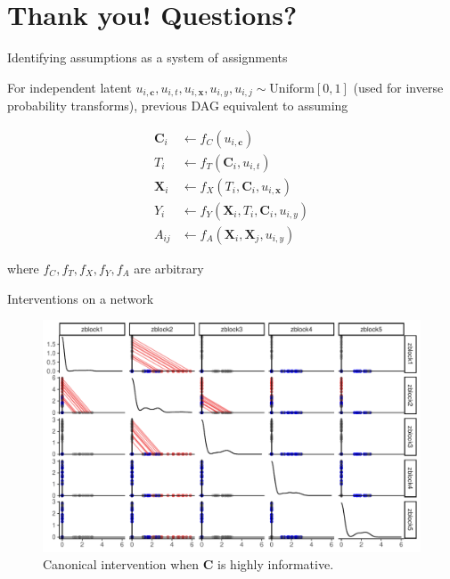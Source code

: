 \documentclass{beamer}
\theoremstyle{remark}
\renewcommand{\c}{\bm c}
\newcommand{\x}{\bm x}
\newcommand{\C}{\bm C}
\newcommand{\X}{\bm X}
\newcommand \dist {\sim}
\begin{document}
\section{Thank you! Questions?}

\begin{frame}{Identifying assumptions as a system of assignments}

    For independent latent $u_{i, \c}, u_{i, t}, u_{i, \x}, u_{i, y}, u_{i, j} \dist \mathrm{Uniform}[0, 1]$ (used for inverse probability transforms), previous DAG equivalent to assuming

    \begin{align*}
        \C_i   & \gets f_C(u_{i, \c})                 \\
        T_i    & \gets f_T(\C_i, u_{i, t})            \\
        \X_i   & \gets f_X(T_i, \C_i, u_{i, \x})      \\
        Y_i    & \gets f_Y(\X_i, T_i, \C_i, u_{i, y}) \\
        A_{ij} & \gets f_A(\X_i, \X_j, u_{i, y})
    \end{align*}

    where $f_C, f_T, f_X, f_Y, f_A$ are arbitrary

\end{frame}

\begin{frame}{Interventions on a network}

    \begin{figure}
        \includegraphics[width=\textwidth]{figures/intervention.pdf}
        \caption{Canonical intervention when $\C$ is highly informative.}
        \label{fig:intervention}
    \end{figure}
\end{frame}
\end{document}
